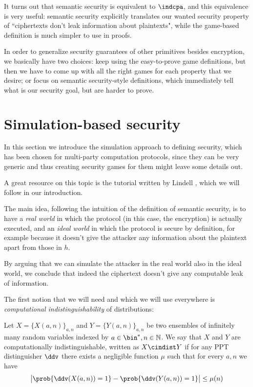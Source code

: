 It turns out that semantic security is equivalent to $\indcpa$, and this equivalence is very useful: semantic security explicitly translates our wanted security property of ``ciphertexts don't leak information about plaintexts", while the game-based definition is much simpler to use in proofs.

In order to generalize security guarantees of other primitives besides encryption, we basically have two choices: keep using the easy-to-prove game definitions, but then we have to come up with all the right games for each property that we desire; or focus on semantic security-style definitions, which immediately tell what is our security goal, but are harder to prove.

\section{Simulation-based security}
In this section we introduce the simulation approach to defining security, which has been chosen for multi-party computation protocols, since they can be very generic and thus creating security games for them might leave some details out.

A great resource on this topic is the tutorial written by Lindell \cite{Lindell_tutorial}, which we will follow in our introduction.

The main idea, following the intuition of the definition of semantic security, is to have a \emph{real world} in which the protocol (in this case, the encryption) is actually executed, and an \emph{ideal world} in which the protocol is secure by definition, for example because it doesn't give the attacker any information about the plaintext apart from those in $h$.

By arguing that we can simulate the attacker in the real world also in the ideal world, we conclude that indeed the ciphertext doesn't give any computable leak of information.

The first notion that we will need and which we will use everywhere is \emph{computational indistinguishability} of distributions:
\begin{definition}
    Let $X=\{ X(a,n) \}_{a,n}$ and $Y=\{ Y(a,n) \}_{a,n}$ be two ensembles of infinitely many random variables indexed by $a\in\bin^\ast,n\in\N$. We say that $X$ and $Y$ are computationally indistinguishable, written as $X\cindist Y$ if for any PPT distinguisher $\ddv$ there exists a negligible function $\mu$ such that for every $a,n$ we have
    $$\left| \prob{\ddv(X(a,n))=1} - \prob{\ddv(Y(a,n))=1} \right|\le\mu(n)$$
\end{definition}

